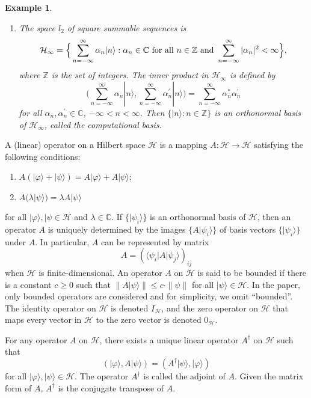 \documentclass[conference,compsoc, 10pt]{IEEEtran}
\newtheorem{example}{Example}[section]
\begin{document}
\begin{appendices}
\begin{example}
\begin{enumerate}
				
				\item The space $l_2$ of square summable sequences is $$\mathcal{H}_\infty=\Big\{\sum_{n=-\infty}^{\infty}\alpha_n|n\rangle:\alpha_n\in\mathbb{C}\
				{\rm for\ all}\ n\in\mathbb{Z}\ {\rm and}\
				\sum_{n=-\infty}^{\infty}|\alpha_n|^{2}<\infty\Big\},$$ where
				$\mathbb{Z}$ is the set of integers. The inner product in
				$\mathcal{H}_\infty$ is defined by
				$$\Big(\sum_{n=-\infty}^{\infty}\alpha_n|n\rangle,\sum_{n=-\infty}^{\infty}\alpha^{\prime}_n|n\rangle\Big)=\sum_{n=-\infty}^{\infty}
				\alpha_n^{\ast}\alpha_n^{\prime}$$ for all
				$\alpha_n,\alpha_n^{\prime}\in\mathbb{C}$, $-\infty <n<\infty$. Then
				$\{|n\rangle: n\in\mathbb{Z}\}$ is an orthonormal basis of
				$\mathcal{H}_\infty$, called the computational basis.
		\end{enumerate}\end{example}
		
		
		A (linear) operator on a Hilbert space $\mathcal{H}$ is a mapping
		$A:\mathcal{H}\rightarrow\mathcal{H}$ satisfying the following
		conditions:\begin{enumerate}\item
			$A(|\varphi\rangle+|\psi\rangle)=A|\varphi\rangle+A|\psi\rangle$;
			\item $A(\lambda |\psi\rangle)=\lambda A|\psi\rangle$
		\end{enumerate} for all $|\varphi\rangle,|\psi\in\mathcal{H}$ and
		$\lambda\in\mathbb{C}$. If $\{|\psi_i\rangle\}$ is an orthonormal
		basis of $\mathcal{H}$, then an operator $A$ is uniquely determined
		by the images $\{A|\psi_i\rangle\}$ of basis vectors
		$\{|\psi_i\rangle\}$ under $A$. In particular, $A$ can be
		represented by matrix
		$$A=\left(\langle\psi_i|A|\psi_j\rangle\right)_{ij}$$ when
		$\mathcal{H}$ is finite-dimensional. An operator $A$ on $\mathcal{H}$ is said to be bounded if there is a
		constant $c\geq 0$ such that $\|A|\psi\rangle\|\leq c\cdot\|\psi\|$
		for all $|\psi\rangle\in\mathcal{H}$. In the paper, only bounded operators are considered and for simplicity, we omit ``bounded''.
		The identity operator
		on $\mathcal{H}$ is denoted $I_{\mathcal{H}}$, and the zero operator
		on $\mathcal{H}$ that maps every vector in $\mathcal{H}$ to the zero
		vector is denoted $0_\mathcal{H}$.
		
		For any operator $A$ on $\mathcal{H}$, there exists a unique linear
		operator $A^{\dag}$ on $\mathcal{H}$ such that
		$$(|\varphi\rangle,
		A|\psi\rangle)=(A^{\dag}|\psi\rangle,|\varphi\rangle)$$ for all
		$|\varphi\rangle, |\psi\rangle\in\mathcal{H}$. The operator
		$A^{\dag}$ is called the adjoint of $A$. Given the matrix form of $A$, $A^\dag$ is the conjugate transpose of $A$.
		

\end{appendices}
\end{document}
